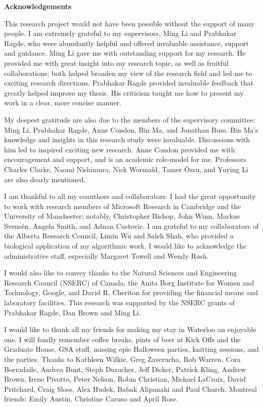 
\begin{center}\textbf{Acknowledgements}\end{center}
This research project would not have been possible without the support of many people. I am extremely grateful to my supervisors, Ming Li and Prabhakar Ragde, who were abundantly helpful and offered invaluable assistance, support and guidance. Ming Li gave me with outstanding support for my research.  He provided me with great insight into my research topic, as well as fruitful collaborations; both helped broaden my view of the research field and led me to exciting research directions.  Prabhakar Ragde provided invaluable feedback that greatly helped improve my thesis.  His criticism taught me how to present my work in a clear, more concise manner. 

My deepest gratitude are also due to the members of the supervisory committee: Ming Li, Prabhakar Ragde, Anne Condon, Bin Ma, and Jonathan Buss.  Bin Ma's knowledge and insights in this research study were invaluable.  Discussions with him led to inspired exciting new research.   Anne Condon provided me with encouragement and support, and is an academic role-model for me.  Professors Charles Clarke, Naomi Nishimura, Nick Wormald, Tamer \"{O}zsu, and Yuying Li are also dearly mentioned. 

I am thankful to all my coauthors and collaborators.  I had the great opportunity to work with research members of Microsoft Research in Cambridge and the University of Manchester; notably, Christopher Bishop, John Winn, Markus Svens\'{e}n, Angela Smith, and Adnan Custovic.  I am grateful to my collaborators of the Alberta Research Council, Limin Wu and Saleh Shah, who provided a biological application of my algorithmic work.  I would like to acknowledge the administrative staff, especially Margaret Towell and Wendy Rush.

 I would also like to convey thanks to the Natural Sciences and Engineering Research Council (NSERC) of Canada, the Anita Borg Institute for Women and Technology, Google, and David R. Cheriton for providing the financial means and laboratory facilities.  This research was supported by the NSERC grants of Prabhakar Ragde, Dan Brown and Ming Li. 

I would like to thank all my friends for making my stay in Waterloo an enjoyable one.  I will fondly remember coffee breaks, pints of beer at Kick Offs and the Graduate House, GSA stuff, missing epic Halloween parties, knitting sessions, and the parties. Thanks to Kathleen Wilkie, Greg Zaverucha, Rob Warren, Cora Borradaile, Andrea Bunt, Steph Durocher, Jeff Dicker, Patrick Kling, Andrew Brown, Irene Pivotto, Peter Nelson, Robin Christian, Michael LaCroix, David Pritchard, Craig Sloss, Alex Hudek, Babak Alipanahi and Paul Church.  Montreal friends: Emily Austin, Christine Caruso and April Rose.  

